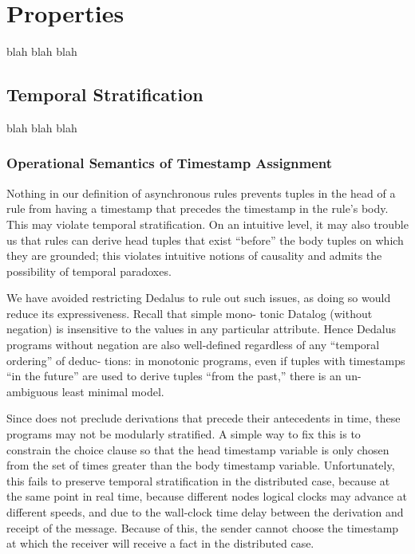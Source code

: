 \section{Properties}

blah blah blah

\subsection{Temporal Stratification}

blah blah blah

\subsubsection{Operational Semantics of Timestamp Assignment}

Nothing in our definition of asynchronous rules prevents tuples
in the head of a rule from having a timestamp that precedes the
timestamp in the rule’s body. This may violate temporal stratification.
On an intuitive level, it may also trouble us that rules can
derive head tuples that exist ``before'' the body tuples on which they
are grounded; this violates intuitive notions of causality and admits
the possibility of temporal paradoxes.

We have avoided restricting Dedalus to rule out such issues, as
doing so would reduce its expressiveness. Recall that simple mono-
tonic Datalog (without negation) is insensitive to the values in any
particular attribute. Hence Dedalus programs without negation are
also well-defined regardless of any ``temporal ordering'' of deduc-
tions: in monotonic programs, even if tuples with timestamps ``in
the future'' are used to derive tuples ``from the past,'' there is an un-
ambiguous least minimal model.


Since  does not preclude derivations that precede their antecedents in time, these programs may not be modularly stratified.  A simple way to fix this is to constrain the choice clause so that the head timestamp variable is only chosen from the set of times greater than the body timestamp variable.  Unfortunately, this fails to preserve temporal stratification in the distributed case, because at the same point in real time, because different nodes logical clocks may advance at different speeds, and due to the wall-clock time delay between the derivation and receipt of the message.  Because of this, the sender cannot choose the timestamp at which the receiver will receive a  fact in the distributed case. 

